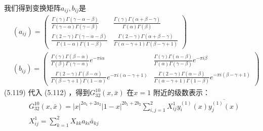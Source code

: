 我们得到变换矩阵$ a_{ij},b_{ij} $是
\begin{align} &\left(a_{i j}\right)=\left(\begin{array}{cc} \frac{\Gamma(\gamma) \Gamma(\gamma-\alpha-\beta)}{\Gamma(\gamma-\alpha) \Gamma(\gamma-\beta)} & \frac{\Gamma(\gamma) \Gamma(\alpha+\beta-\gamma)}{\Gamma(\alpha) \Gamma(\beta)} \\ \frac{\Gamma(2-\gamma) \Gamma(\gamma-\alpha-\beta)}{\Gamma(1-\alpha) \Gamma(1-\beta)} & \frac{\Gamma(2-\gamma) \Gamma(\alpha+\beta-\gamma)}{\Gamma(\alpha-\gamma+1) \Gamma(\beta-\gamma+1)} \end{array}\right) \\ &\left(b_{i j}\right)=\left(\begin{array}{cc} \frac{\Gamma(\gamma) \Gamma(\beta-\alpha)}{\Gamma(\beta) \Gamma(\gamma-\alpha)} e^{-\pi i \alpha} & \frac{\Gamma(\gamma) \Gamma(\alpha-\beta)}{\Gamma(\alpha) \Gamma(\gamma-\beta)} e^{-\pi i \beta} \\ \frac{\Gamma(2-\gamma) \Gamma(\beta-\alpha)}{\Gamma(\beta-\gamma+1) \Gamma(1-\alpha)} e^{-\pi i(\alpha-\gamma+1)} &\frac{\Gamma(2-\gamma) \Gamma(\alpha-\beta)}{\Gamma(\alpha-\gamma+1) \Gamma(1-\beta)} e^{-\pi i(\beta-\gamma+1)} \end{array}\right)\end{align}
(5.119) 代入 (5.112) ，得到$ G_{32}^{10}(x, \bar{x})$ 在$ x=1$ 附近的级数表示：
\begin{align} &G_{32}^{10}(x, \bar{x})=|x|^{2 a_{1}+2 a_{2}}|1-x|^{2 b_{1}+2 b_{2}} \sum_{i, j=1}^{2} X_{i j}^{1} y_{i}^{(1)}(x) \overline{y_{j}^{(1)}(x)} \\ &X_{i j}^{1}=\sum_{k=1}^{2} X_{k k} a_{k i} \bar{a}_{k j} \end{align}

